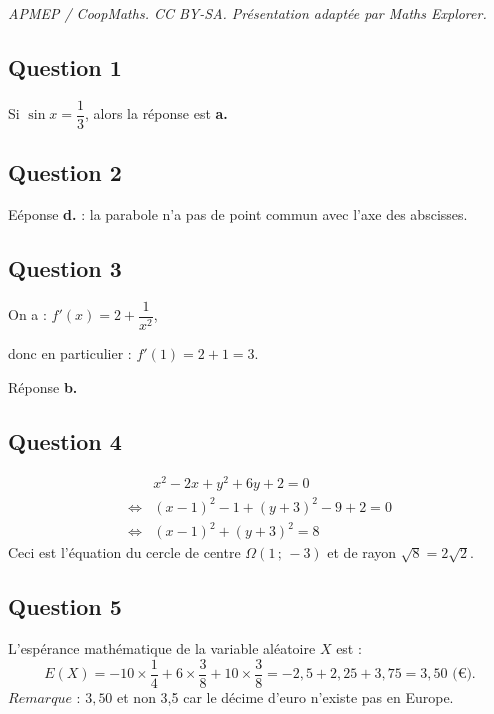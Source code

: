 \documentclass[10pt]{article}
\begin{document}
\noindent\textit{APMEP / CoopMaths. CC BY-SA. Présentation adaptée par Maths Explorer.}\par\medskip
\subsection*{Question 1}

Si \( \sin x = \dfrac{1}{3} \), alors la réponse est \textbf{a.}

\subsection*{Question 2}

Eéponse \textbf{d.} : la parabole n'a pas de point commun avec l'axe des abscisses.

\subsection*{Question 3}

On a : \(f'(x) = 2 + \dfrac{1}{x^2}\),

donc en particulier : \(f'(1) = 2 + 1 = 3\).

Réponse \textbf{b.}

\subsection*{Question 4}

\begin{align*}
&x^2 - 2x + y^2 + 6y + 2 = 0  \\
\iff &(x - 1)^2 - 1 + (y + 3)^2 - 9 + 2 = 0 \\
\iff &(x - 1)^2 + (y + 3)^2 = 8
\end{align*}
Ceci est l'équation du cercle de centre \( \Omega(1\,;\,-3) \) et de rayon \( \sqrt{8} = 2\sqrt{2} \).

\subsection*{Question 5}

L'espérance mathématique de la variable aléatoire \( X \) est :
\[
E(X) = -10 \times \dfrac{1}{4} + 6 \times \dfrac{3}{8} + 10 \times \dfrac{3}{8} = -2{,}5 + 2{,}25 + 3{,}75 = 3{,}50 \text{ (€)}.
\]
\(\textit{Remarque : }  3{,}50\) et non 3{,}5 car le décime d'euro n'existe pas en Europe.
\end{document}
